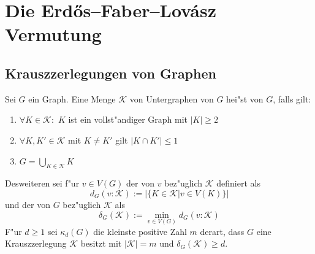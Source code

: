 \section{Die Erd\H{o}s--Faber--Lov\'asz Vermutung}
\label{sec:EFL-Vermutung}


\subsection{Krauszzerlegungen von Graphen}
\label{subsec:Krauszzerlegung}
\begin{definition}
    \label{def:Krauszzerlegung}
    Sei $G$ ein Graph. Eine Menge $\mathcal K$ von Untergraphen von $G$ hei"st  von $G$, falls gilt:
    \begin{enumerate}[label=(\roman*)]
        \item $\forall K \in \mathcal K:$ $K$ ist ein vollst"andiger Graph mit $|K| \geq 2$
        \item $\forall K, K'\in \mathcal K$ mit $K\neq K'$ gilt $|K\cap K'| \leq 1$
        \item $G=\bigcup\limits_{K\in \mathcal K}K$
    \end{enumerate}
    Desweiteren sei f"ur $v\in V(G)$ der  von $v$ bez"uglich $\mathcal K$ definiert als $$d_G(v:\mathcal K) := |\{ K\in\mathcal K| v \in V(K)\}|$$ und der  von $G$ bez"uglich $\mathcal K$ als $$\delta_G(\mathcal K) := \min\limits_{v\in V(G)}d_G(v:\mathcal K)$$ 
    F"ur $d \geq 1$ sei $\kappa_d(G)$ die kleinste positive Zahl $m$ derart, dass $G$ eine Krauszzerlegung $\mathcal K$ besitzt mit $|\mathcal K| = m$ und $\delta_G(\mathcal K) \geq d$.
\end{definition}
